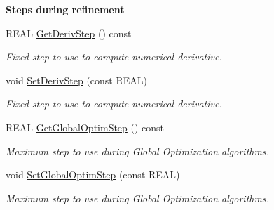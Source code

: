 \begin{Indent}\textbf{ Steps during refinement}\par
\begin{DoxyCompactItemize}
\item 
\mbox{\label{class_obj_cryst_1_1_refinable_par_a07035d1189a9bcaa7d694dd0d6f98997}} 
R\+E\+AL \mbox{\hyperlink{class_obj_cryst_1_1_refinable_par_a07035d1189a9bcaa7d694dd0d6f98997}{Get\+Deriv\+Step}} () const
\begin{DoxyCompactList}\small\item\em Fixed step to use to compute numerical derivative. \end{DoxyCompactList}\item 
\mbox{\label{class_obj_cryst_1_1_refinable_par_a3156b809e45a6314a680bbe3dec1a573}} 
void \mbox{\hyperlink{class_obj_cryst_1_1_refinable_par_a3156b809e45a6314a680bbe3dec1a573}{Set\+Deriv\+Step}} (const R\+E\+AL)
\begin{DoxyCompactList}\small\item\em Fixed step to use to compute numerical derivative. \end{DoxyCompactList}\item 
\mbox{\label{class_obj_cryst_1_1_refinable_par_ae8357ccc8a0826cb6b02288c39f9a62a}} 
R\+E\+AL \mbox{\hyperlink{class_obj_cryst_1_1_refinable_par_ae8357ccc8a0826cb6b02288c39f9a62a}{Get\+Global\+Optim\+Step}} () const
\begin{DoxyCompactList}\small\item\em Maximum step to use during Global Optimization algorithms. \end{DoxyCompactList}\item 
\mbox{\label{class_obj_cryst_1_1_refinable_par_aa0eccaf87210097fb9e5239a97f9dcd1}} 
void \mbox{\hyperlink{class_obj_cryst_1_1_refinable_par_aa0eccaf87210097fb9e5239a97f9dcd1}{Set\+Global\+Optim\+Step}} (const R\+E\+AL)
\begin{DoxyCompactList}\small\item\em Maximum step to use during Global Optimization algorithms. \end{DoxyCompactList}\end{DoxyCompactItemize}
\end{Indent}
